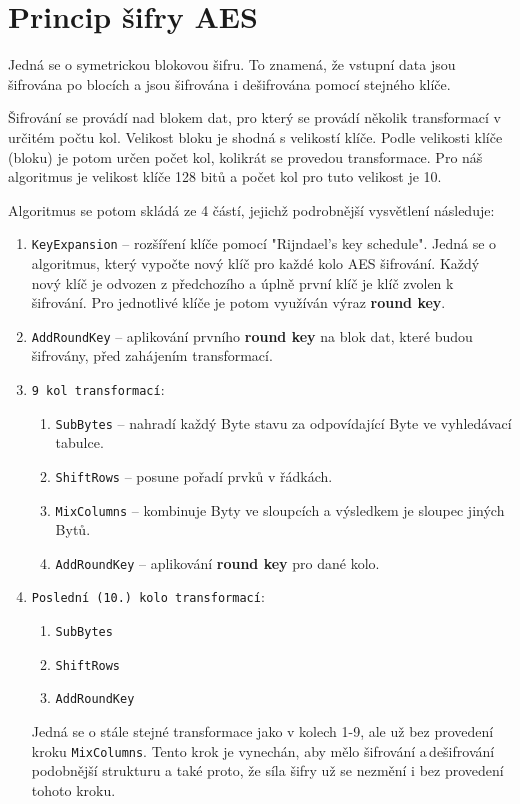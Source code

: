 \documentclass[12pt]{article}
\begin{document}
\section{Princip šifry AES}
Jedná se o symetrickou blokovou šifru. To znamená, že vstupní data jsou
šifrována po blocích a jsou šifrována i dešifrována pomocí stejného klíče.

Šifrování se provádí nad blokem dat, pro který se provádí několik transformací
v určitém počtu kol. Velikost bloku je shodná s velikostí klíče. Podle velikosti
klíče (bloku) je potom určen počet kol, kolikrát se provedou transformace. Pro
náš algoritmus je velikost klíče 128 bitů a počet kol pro tuto velikost je 10.

Algoritmus se potom skládá ze 4 částí, jejichž podrobnější vysvětlení následuje:
\begin{enumerate}
	\item \texttt{KeyExpansion} -- rozšíření klíče pomocí "Rijndael's key
		schedule". Jedná se o algoritmus, který vypočte nový klíč pro
		každé kolo AES šifrování. Každý nový klíč je odvozen z
		předchozího a úplně první klíč je klíč zvolen k šifrování.
		Pro jednotlivé klíče je potom využíván výraz \textbf{round key}.
	\item \texttt{AddRoundKey} -- aplikování prvního \textbf{round key} na
		blok dat, které budou šifrovány, před zahájením transformací.
	\item \texttt{9 kol transformací}:
		\begin{enumerate}
			\item \texttt{SubBytes} -- nahradí každý Byte stavu za 
				odpovídající Byte ve vyhledávací tabulce.
			\item \texttt{ShiftRows} -- posune pořadí prvků v
				řádkách.
			\item \texttt{MixColumns} -- kombinuje Byty ve sloupcích
				a výsledkem je sloupec jiných Bytů.
			\item \texttt{AddRoundKey} -- aplikování 
				\textbf{round key} pro dané kolo.
		\end{enumerate}
	\item \texttt{Poslední (10.) kolo transformací}:
		\begin{enumerate}
			\item \texttt{SubBytes}	
			\item \texttt{ShiftRows}
			\item \texttt{AddRoundKey}
		\end{enumerate}
		Jedná se o stále stejné transformace jako v kolech 1-9, ale už
		bez provedení kroku \texttt{MixColumns}. Tento krok je
		vynechán, aby mělo šifrování a\,dešifrování podobnější
		strukturu a také proto, že síla šifry už se nezmění i bez
		provedení tohoto kroku.
\end{enumerate}
%
\end{document}
